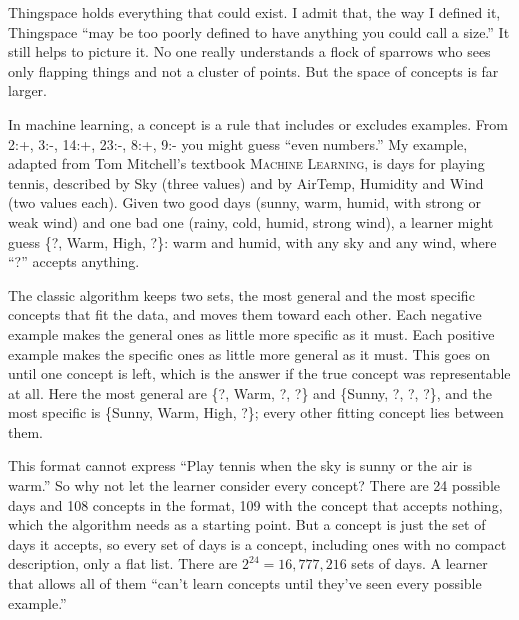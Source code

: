 
Thingspace holds everything that could exist. I admit that, the way I defined it, Thingspace ``may be too poorly defined to have anything you could call a size.'' It still helps to picture it. No one really understands a flock of sparrows who sees only flapping things and not a cluster of points. But the space of concepts is far larger. 

In machine learning, a concept is a rule that includes or excludes examples. From 2:+, 3:-, 14:+, 23:-, 8:+, 9:- you might guess ``even numbers.'' My example, adapted from Tom Mitchell's textbook \textsc{Machine Learning}, is days for playing tennis, described by Sky (three values) and by AirTemp, Humidity and Wind (two values each). Given two good days (sunny, warm, humid, with strong or weak wind) and one bad one (rainy, cold, humid, strong wind), a learner might guess \{?, Warm, High, ?\}: warm and humid, with any sky and any wind, where ``?'' accepts anything.

The classic algorithm keeps two sets, the most general and the most specific concepts that fit the data, and moves them toward each other. Each negative example makes the general ones as little more specific as it must. Each positive example makes the specific ones as little more general as it must. This goes on until one concept is left, which is the answer if the true concept was representable at all. Here the most general are \{?, Warm, ?, ?\} and \{Sunny, ?, ?, ?\}, and the most specific is \{Sunny, Warm, High, ?\}; every other fitting concept lies between them. 

This format cannot express ``Play tennis when the sky is sunny or the air is warm.'' So why not let the learner consider every concept? There are 24 possible days and 108 concepts in the format, 109 with the concept that accepts nothing, which the algorithm needs as a starting point. But a concept is just the set of days it accepts, so every set of days is a concept, including ones with no compact description, only a flat list. There are $2^{24} = 16{,}777{,}216$ sets of days. A learner that allows all of them ``can't learn concepts until they've seen every possible example.'' 

